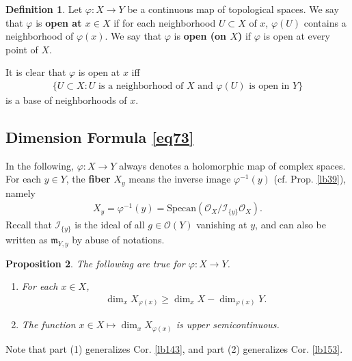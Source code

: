 \documentclass[12pt,b5paper,notitlepage]{report}
\theoremstyle{definition}
\newtheorem{df}{Definition}[section]
\theoremstyle{plain}
\newtheorem{pp}[df]{Proposition}
\newcommand{\fk}{\mathfrak}
\newcommand{\scr}{\mathscr}
\newcommand{\Specan}{\mathrm{Specan}}
\numberwithin{equation}{section}
\begin{document}
\begin{df}
Let $\varphi:X\rightarrow Y$ be a continuous map of topological spaces. We say that $\varphi$ is \textbf{open at $x\in X$}  if for each neighborhood $U\subset X$ of $x$, $\varphi(U)$ contains a neighborhood of $\varphi(x)$. We say that $\varphi$ is \textbf{open (on $X$)} if $\varphi$ is open at every point of $X$.

It is clear that $\varphi$ is open at $x$ iff
\begin{align*}
\{U\subset X:U\text{ is a neighborhood of }X\text{ and }\varphi(U)\text{ is open in }Y\}
\end{align*}
is a base of neighborhoods of $x$. \hfill\qedsymbol
\end{df}



\subsection{Dimension Formula \eqref{eq73}}



In the following, $\varphi:X\rightarrow Y$ always denotes a holomorphic map of complex spaces. For each $y\in Y$, the \textbf{fiber} $X_y$ means the inverse image $\varphi^{-1}(y)$ (cf. Prop. \ref{lb39}),  namely
\begin{align*}
X_y=\varphi^{-1}(y)=\Specan(\scr O_X/\scr I_{\{y\}}\scr O_X).
\end{align*}
Recall that $\scr I_{\{y\}}$ is the ideal of all $g\in\scr O(Y)$ vanishing at $y$, and can also be written as $\fk m_{Y,y}$ by abuse of notations.

\begin{pp}\label{lb151}
The following are true for $\varphi:X\rightarrow Y$.
\begin{enumerate}[label=(\arabic*)]
\item For each $x\in X$,
\begin{align}
\dim_x X_{\varphi(x)}\geq\dim_x X-\dim_{\varphi(x)} Y.
\end{align}
\item The function $x\in X\mapsto \dim_x X_{\varphi(x)}$ is upper semicontinuous.
\end{enumerate}
\end{pp}

Note that part (1) generalizes Cor. \ref{lb143}, and part (2) generalizes Cor. \ref{lb153}.
\end{document}
